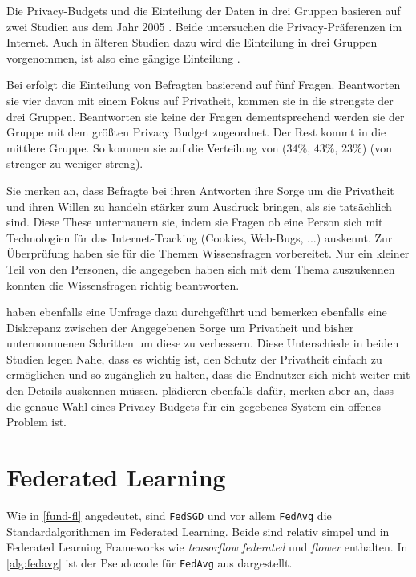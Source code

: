 Die Privacy-Budgets und die Einteilung der Daten in drei Gruppen \citeauthor{boenisch:2023} basieren auf zwei Studien aus dem Jahr 2005 \cite{jensen:2005, acquisti:2005}. Beide untersuchen die Privacy-Präferenzen im Internet. Auch in älteren Studien dazu wird die Einteilung in drei Gruppen vorgenommen, ist also eine gängige Einteilung \cite{westin:1998}.

Bei \textcite{jensen:2005} erfolgt die Einteilung von Befragten basierend auf fünf Fragen. Beantworten sie vier davon mit einem Fokus auf Privatheit, kommen sie in die strengste der drei Gruppen. Beantworten sie keine der Fragen dementsprechend werden sie der Gruppe mit dem größten Privacy Budget zugeordnet. Der Rest kommt in die mittlere Gruppe. So kommen sie auf die Verteilung von ($34\%$, $43\%$, $23\%$) (von strenger zu weniger streng). 

Sie merken an, dass Befragte bei ihren Antworten ihre Sorge um die Privatheit und ihren Willen zu handeln stärker zum Ausdruck bringen, als sie tatsächlich sind. Diese These untermauern sie, indem sie Fragen ob eine Person sich mit Technologien für das Internet-Tracking (Cookies, Web-Bugs, ...) auskennt. Zur Überprüfung haben sie für die Themen Wissensfragen vorbereitet. Nur ein kleiner Teil von den Personen, die angegeben haben sich mit dem Thema auszukennen konnten die Wissensfragen richtig beantworten.

\textcite{acquisti:2005} haben ebenfalls eine Umfrage dazu durchgeführt und bemerken ebenfalls eine Diskrepanz zwischen der Angegebenen Sorge um Privatheit und bisher unternommenen Schritten um diese zu verbessern. Diese Unterschiede in beiden Studien legen Nahe, dass es wichtig ist, den Schutz der Privatheit einfach zu ermöglichen und so zugänglich zu halten, dass die Endnutzer sich nicht weiter mit den Details auskennen müssen. \textcite{jorgensen:2015} plädieren ebenfalls dafür, merken aber an, dass die genaue Wahl eines Privacy-Budgets für ein gegebenes System ein offenes Problem ist.

\section{Federated Learning}\label{sec:rw-fl}

Wie in \autoref{fund-fl} angedeutet, sind \texttt{FedSGD} und vor allem \texttt{FedAvg} die Standardalgorithmen im Federated Learning. Beide sind relativ simpel und in Federated Learning Frameworks wie \textit{tensorflow federated} und \textit{flower} enthalten. In \autoref{alg:fedavg} ist der Pseudocode für \texttt{FedAvg} aus \cite{mcmahan:2016} dargestellt. 



